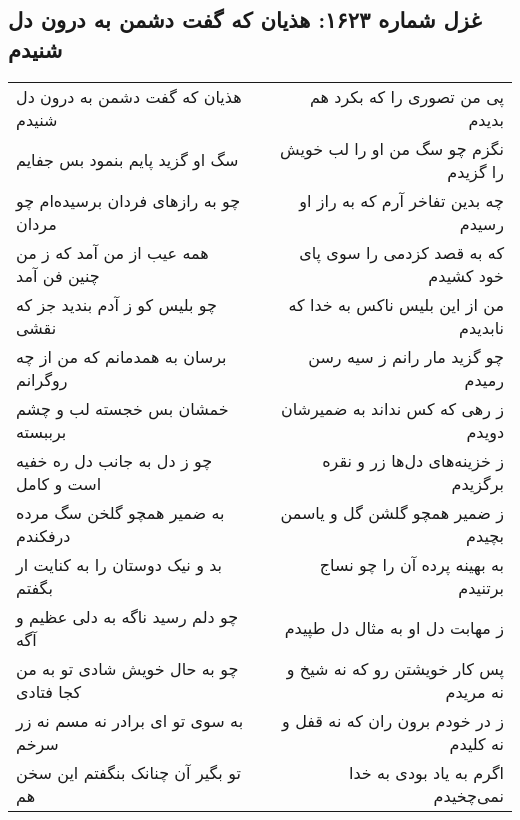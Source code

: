 \begin{center}
\section*{غزل شماره ۱۶۲۳: هذیان که گفت دشمن به درون دل شنیدم}
\label{sec:1623}
\begin{longtable}{l p{0.5cm} r}
هذیان که گفت دشمن به درون دل شنیدم
&&
پی من تصوری را که بکرد هم بدیدم
\\
سگ او گزید پایم بنمود بس جفایم
&&
نگزم چو سگ من او را لب خویش را گزیدم
\\
چو به رازهای فردان برسیده‌ام چو مردان
&&
چه بدین تفاخر آرم که به راز او رسیدم
\\
همه عیب از من آمد که ز من چنین فن آمد
&&
که به قصد کزدمی را سوی پای خود کشیدم
\\
چو بلیس کو ز آدم بندید جز که نقشی
&&
من از این بلیس ناکس به خدا که نابدیدم
\\
برسان به همدمانم که من از چه روگرانم
&&
چو گزید مار رانم ز سیه رسن رمیدم
\\
خمشان بس خجسته لب و چشم برببسته
&&
ز رهی که کس نداند به ضمیرشان دویدم
\\
چو ز دل به جانب دل ره خفیه است و کامل
&&
ز خزینه‌های دل‌ها زر و نقره برگزیدم
\\
به ضمیر همچو گلخن سگ مرده درفکندم
&&
ز ضمیر همچو گلشن گل و یاسمن بچیدم
\\
بد و نیک دوستان را به کنایت ار بگفتم
&&
به بهینه پرده آن را چو نساج برتنیدم
\\
چو دلم رسید ناگه به دلی عظیم و آگه
&&
ز مهابت دل او به مثال دل طپیدم
\\
چو به حال خویش شادی تو به من کجا فتادی
&&
پس کار خویشتن رو که نه شیخ و نه مریدم
\\
به سوی تو ای برادر نه مسم نه زر سرخم
&&
ز در خودم برون ران که نه قفل و نه کلیدم
\\
تو بگیر آن چنانک بنگفتم این سخن هم
&&
اگرم به یاد بودی به خدا نمی‌چخیدم
\\
\end{longtable}
\end{center}
